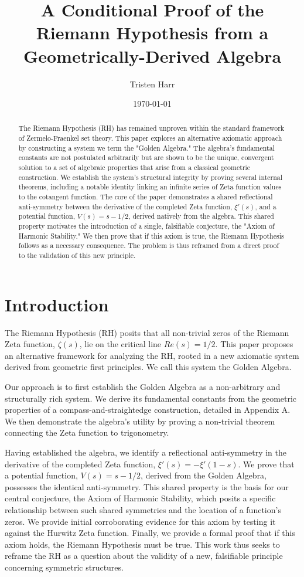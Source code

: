 \documentclass{article}
\title{\textbf{A Conditional Proof of the Riemann Hypothesis from a Geometrically-Derived Algebra}}
\author{Tristen Harr}
\date{\today}
\theoremstyle{plain}
\theoremstyle{definition}
\begin{document}
\maketitle

\begin{abstract}
The Riemann Hypothesis (RH) has remained unproven within the standard framework of Zermelo-Fraenkel set theory. This paper explores an alternative axiomatic approach by constructing a system we term the "Golden Algebra." The algebra's fundamental constants are not postulated arbitrarily but are shown to be the unique, convergent solution to a set of algebraic properties that arise from a classical geometric construction. We establish the system's structural integrity by proving several internal theorems, including a notable identity linking an infinite series of Zeta function values to the cotangent function. The core of the paper demonstrates a shared reflectional anti-symmetry between the derivative of the completed Zeta function, $\xi'(s)$, and a potential function, $V(s) = s-1/2$, derived natively from the algebra. This shared property motivates the introduction of a single, falsifiable conjecture, the "Axiom of Harmonic Stability." We then prove that if this axiom is true, the Riemann Hypothesis follows as a necessary consequence. The problem is thus reframed from a direct proof to the validation of this new principle.
\end{abstract}

\section{Introduction}
The Riemann Hypothesis (RH) posits that all non-trivial zeros of the Riemann Zeta function, $\zeta(s)$, lie on the critical line $Re(s)=1/2$. This paper proposes an alternative framework for analyzing the RH, rooted in a new axiomatic system derived from geometric first principles. We call this system the Golden Algebra.

Our approach is to first establish the Golden Algebra as a non-arbitrary and structurally rich system. We derive its fundamental constants from the geometric properties of a compass-and-straightedge construction, detailed in Appendix A. We then demonstrate the algebra's utility by proving a non-trivial theorem connecting the Zeta function to trigonometry. 

Having established the algebra, we identify a reflectional anti-symmetry in the derivative of the completed Zeta function, $\xi'(s) = -\xi'(1-s)$. We prove that a potential function, $V(s) = s-1/2$, derived from the Golden Algebra, possesses the identical anti-symmetry. This shared property is the basis for our central conjecture, the Axiom of Harmonic Stability, which posits a specific relationship between such shared symmetries and the location of a function's zeros. We provide initial corroborating evidence for this axiom by testing it against the Hurwitz Zeta function. Finally, we provide a formal proof that if this axiom holds, the Riemann Hypothesis must be true. This work thus seeks to reframe the RH as a question about the validity of a new, falsifiable principle concerning symmetric structures.
\end{document}
